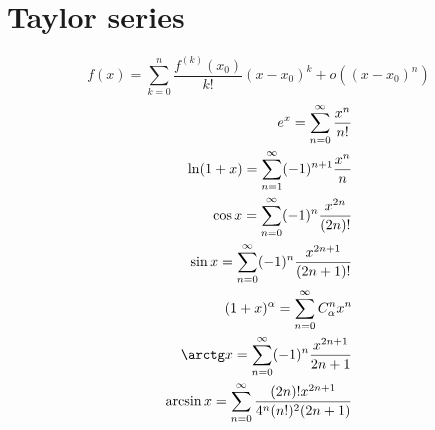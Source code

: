 \section{Taylor series}
\[f(x) = \sum_{k=0}^n \frac{f^{(k)}(x_0)}{k!} (x-x_0)^k + o((x-x_0)^n)\]
\begin{align*}
	e^x = \sum_{n = 0}^\infty \frac{x^n}{n!} \\
	\ln (1 + x) = \sum_{n = 1}^\infty (-1)^{n + 1} \frac{x^n}{n} \\
	\cos x = \sum_{n=0}^\infty (-1)^n \frac{x^{2n}}{(2n)!} \\
	\sin x = \sum_{n=0}^\infty (-1)^n \frac{x^{2n + 1}}{(2n + 1)!} \\
	(1 + x)^\alpha = \sum_{n=0}^\infty C_\alpha^n x^n \\
	\arctg x = \sum_{n=0}^\infty (-1)^n \frac{x^{2n + 1}}{2n + 1} \\
	\arcsin x = \sum_{n=0}^\infty \frac{(2n)! x^{2n + 1}}{4^n (n!)^2 (2n + 1)}
\end{align*}
